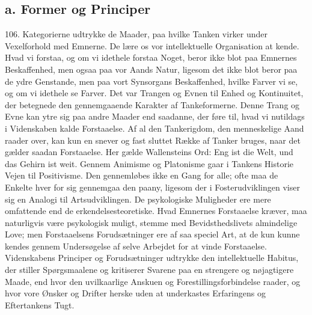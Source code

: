 \documentclass[12pt,a4paper]{book}
\newcommand{\opage}[1]{\marginnote{\footnotesize\textit{[#1]}}}
\begin{document}
\subsection*{a. Former og Principer}

106. Kategorierne udtrykke de Maader, paa hvilke Tanken virker under Vexelforhold
med Emnerne. De lære os vor intellektuelle Organisation at kende. Hvad vi forstaa,
og om vi idethele forstaa Noget, beror ikke blot paa Emnernes Beskaffenhed, men
ogsaa paa vor Aands Natur, ligesom det ikke blot beror paa de ydre Genstande, men
paa vort Synsorgans Beskaffenhed, hvilke Farver vi se, og om vi idethele se Farver.
Det var Trangen og Evnen til Enhed og Kontinuitet, der betegnede den
gennemgaaende Karakter af Tankeformerne. Denne Trang og Evne kan ytre sig paa
andre Maader end saadanne, der føre til, hvad vi nutildags i Videnskaben kalde
Forstaaelse. Af al den Tankerigdom, den menneskelige Aand raader over, kan kun en
snever og fast sluttet Række af Tanker bruges, naar det gælder saadan Forstaaelse.
Her gælde Wallensteins Ord: Eng ist die Welt, und das Gehirn ist weit. Gennem
Animisme og Platonisme gaar i Tankens Historie Vejen til Positivisme. Den
gennemløbes ikke en Gang for alle; ofte maa de Enkelte hver \opage{255} for sig gennemgaa den
paany, ligesom der i Fosterudviklingen viser sig en Analogi til Artsudviklingen. De
psykologiske Muligheder ere mere omfattende end de erkendelsesteoretiske. Hvad
Emnernes Forstaaelse kræver, maa naturligvis være psykologisk muligt, stemme med
Bevidsthedslivets almindelige Love; men Forstaaelsens Forudsætninger ere af saa
speciel Art, at de kun kunne kendes gennem Undersøgelse af selve Arbejdet for at
vinde Forstaaelse. Videnskabens Principer og Forudsætninger udtrykke den
intellektuelle Habitus, der stiller Spørgsmaalene og kritiserer Svarene paa en
strengere og nøjagtigere Maade, end hvor den uvilkaarlige Anskuen og
Forestillingsforbindelse raader, og hvor vore Ønsker og Drifter herske uden at
underkastes Erfaringens og Eftertankens Tugt.
\end{document}
